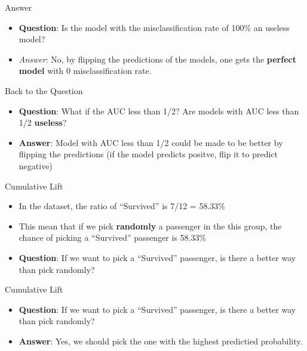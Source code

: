 \documentclass[
  ignorenonframetext,
]{beamer}
\providecommand{\tightlist}{%
  \setlength{\itemsep}{0pt}\setlength{\parskip}{0pt}}
\begin{document}
\begin{frame}{Answer}
\protect\hypertarget{answer}{}

\begin{itemize}
\tightlist
\item
  \textbf{Question}: Is the model with the misclassification rate of
  100\% an useless model?
\item
  \emph{Answer}: No, by flipping the predictions of the models, one gets
  the \textbf{perfect model} with 0 misclassification rate.
\end{itemize}

\end{frame}

\begin{frame}{Back to the Question}
\protect\hypertarget{back-to-the-question}{}

\begin{itemize}
\item
  \textbf{Question}: What if the AUC less than 1/2? Are models with AUC
  less than 1/2 \textbf{useless}?
\item
  \textbf{Answer}: Model with AUC less than 1/2 could be made to be
  better by flipping the predictions (if the model predicts positve,
  flip it to predict negative)
\end{itemize}

\end{frame}

\begin{frame}{Cumulative Lift}
\protect\hypertarget{cumulative-lift}{}

\begin{itemize}
\tightlist
\item
  In the dataset, the ratio of ``Survived'' is 7/12 = 58.33\%
\item
  This mean that if we pick \textbf{randomly} a passenger in the this
  group, the chance of picking a ``Survived'' passenger is 58.33\%
\item
  \textbf{Question}: If we want to pick a ``Survived'' passenger, is
  there a better way than pick randomly?
\end{itemize}

\end{frame}

\begin{frame}{Cumulative Lift}
\protect\hypertarget{cumulative-lift-1}{}

\begin{itemize}
\tightlist
\item
  \textbf{Question}: If we want to pick a ``Survived'' passenger, is
  there a better way than pick randomly?
\item
  \textbf{Answer}: Yes, we should pick the one with the highest
  predictied probability.
\end{itemize}

\end{frame}
\end{document}
